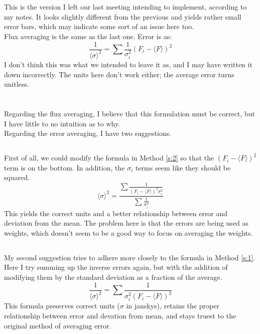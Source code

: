 \documentclass{article}
\newcommand{\av}[1]{\langle #1 \rangle}
\begin{document}
\section{} \label{s:3}
This is the version I left our last meeting intending to implement, according to my notes.
It looks slightly different from the previous and yields rather small error bars, which
may indicate some sort of an issue here too. \\
Flux averaging is the same as the last one.
Error is as:
$$ \frac{1}{\av{\sigma}^{2}} = \sum \frac{1}{\sigma_{i}^{2}} (F_{i} - \av{F})^{2} $$
I don't think this was what we intended to leave it as,
and I may have written it down incorrectly.
The units here don't work either; the average error turns unitless.

\section{} \label{s:4}
Regarding the flux averaging, I believe that this formulation must be correct,
but I have little to no intuition as to why. \\
Regarding the error averaging, I have two suggestions.
\subsection{} \label{s:41}
First of all, we could modify the formula in Method \ref{s:2} so that the $(F_{i} - \av{F})^{2}$
term is on the bottom.
In addition, the $\sigma_{i}$ terms seem like they should be squared.
$$ \av{\sigma}^{2} =  \frac{\sum \frac{1}{(F_{i} - \av{F})^{2} \sigma_{i}^{2}}}{\sum \frac{1}{\sigma_{i}^{2}}} $$
This yields the correct units and a better relationship between error and deviation from the mean.
The problem here is that the errors are being used as weights, which doesn't seem to be a good way
to focus on averaging the weights.
\subsection{} \label{s:42}
My second suggestion tries to adhere more closely to the formula in Method \ref{s:1}.
Here I try summing up the inverse errors again, but with the addition of modifying them by the
standard deviation as a fraction of the average.
$$ \frac{1}{\av{\sigma}^{2}} = \sum \frac{1}{\sigma_{i}^{2} (F_{i} - \av{F})^{2} } $$
This formula preserves correct units ($\sigma$ in janskys),
retains the proper relationship between error and devation from mean,
and stays truest to the original method of averaging error. \\
\end{document}
